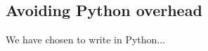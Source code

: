 \subsection{Avoiding Python overhead}
\label{sec:impl_overhead}

We have chosen to write  in Python... %




